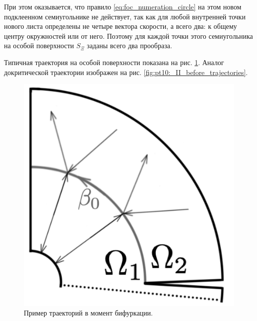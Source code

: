 При этом оказывается, что правило \eqref{eq:foc_numeration_circle} на этом новом подклеенном семиугольнике не действует, так как для любой внутренней точки нового листа определены не четыре вектора скорости, а всего два: к общему центру окружностей или от него. Поэтому для каждой точки этого семиугольника на особой поверхности $S_\Xi$ заданы всего два прообраза. 

Типичная траектория на особой поверхности показана на рис.     \ref{fig:pt10:_II_trajectories_1}. Аналог докритической траектории изображен на рис.     \ref{fig:pt10:_II_before_trajectories}.
\begin{figure}[!htb]
\centering
\includegraphics[scale=0.1]{images/section3_circular/atoms/II/bifurcation/trajectories_1.pdf}
    \caption{Пример траекторий в момент бифуркации.}
    \label{fig:pt10:_II_trajectories_1}
\endminipage\hfill
{}
\centering

\end{figure}
